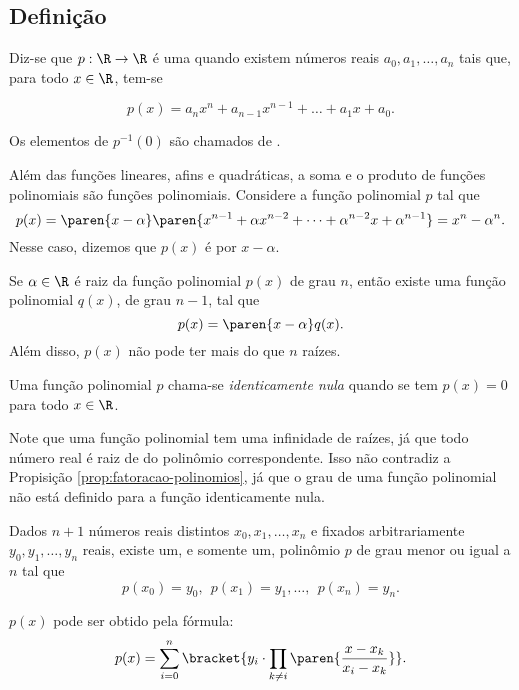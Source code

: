 \subsection{Definição}
\label{sec:definicao-funcoes-polinomiais}

\begin{definition}
Diz-se que $p: \R \to \R$ é uma  quando
existem números reais $a_0, a_1, \dots , a_n$ tais que, para todo $x
\in \R$, tem-se

\begin{equation}\label{funcpol}
p(x) = a_n x^n + a_{n-1} x^{n-1} + \dots + a_1 x + a_0.
\end{equation}

Os elementos de $p^{-1}(0)$ são chamados de .
\end{definition}

\begin{example}
Além das funções lineares, afins e quadráticas, a soma e o produto
de funções polinomiais são funções polinomiais. Considere a função
polinomial $p$ tal que $$p(x) = \paren{x - \alpha} \paren{x^{n-1} +
\alpha x^{n-2} + \dots + \alpha^{n-2}x+ \alpha^{n-1}}=x^n -
\alpha^n.$$ Nesse caso, dizemos que $p(x)$ é  por $x-
\alpha$.
\end{example}

\begin{proposition}
\label{prop:fatoracao-polinomios}
Se $\alpha \in \R$ é raiz da função polinomial $p(x)$ de grau $n$,
então existe uma função polinomial $q(x)$, de grau $n-1$, tal que
$$p(x) = \paren{x- \alpha}q(x).$$
Além disso, $p(x)$ não pode ter mais do que $n$ raízes.
\end{proposition}

\begin{definition}
Uma função polinomial $p$ chama-se \emph{identicamente nula} quando
se tem $p(x) = 0$ para todo $x \in \R$.
\end{definition}

\begin{remark}
Note que uma função polinomial tem uma infinidade de raízes, 
já que todo número real é raiz de do polinômio correspondente. 
Isso não contradiz a Propisição \ref{prop:fatoracao-polinomios}, 
já que o grau de uma função polinomial não está definido para a função identicamente nula.
\end{remark}

\begin{proposition}
Dados $n+1$ números reais distintos $x_0, x_1 , \dots , x_n$ e
fixados arbitrariamente $y_0, y_1, \dots, y_n$ reais, existe
um, e somente um, polinômio $p$ de grau menor ou igual a $n$ tal que
$$p(x_0) = y_0, \ \ p(x_1) = y_1,  \dots , \ \ p(x_n) = y_n.$$

$p(x)$ pode ser obtido pela fórmula:
$$p(x) = \sum_{i=0}^{n} \bracket{y_i \cdot \prod_{k \neq i} \paren{\frac {x-
x_k}{x_i-x_k}}}.$$
\end{proposition}